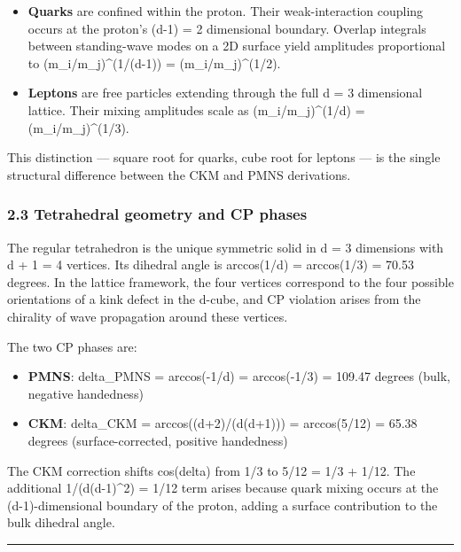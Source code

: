 \documentclass[
]{article}
\providecommand{\tightlist}{%
  \setlength{\itemsep}{0pt}\setlength{\parskip}{0pt}}
\begin{document}
\begin{itemize}
\item
  \textbf{Quarks} are confined within the proton. Their weak-interaction
  coupling occurs at the proton's (d-1) = 2 dimensional boundary.
  Overlap integrals between standing-wave modes on a 2D surface yield
  amplitudes proportional to (m\_i/m\_j)\^{}(1/(d-1)) =
  (m\_i/m\_j)\^{}(1/2).
\item
  \textbf{Leptons} are free particles extending through the full d = 3
  dimensional lattice. Their mixing amplitudes scale as
  (m\_i/m\_j)\^{}(1/d) = (m\_i/m\_j)\^{}(1/3).
\end{itemize}

This distinction --- square root for quarks, cube root for leptons ---
is the single structural difference between the CKM and PMNS
derivations.

\subsubsection{2.3 Tetrahedral geometry and CP
phases}\label{tetrahedral-geometry-and-cp-phases}

The regular tetrahedron is the unique symmetric solid in d = 3
dimensions with d + 1 = 4 vertices. Its dihedral angle is arccos(1/d) =
arccos(1/3) = 70.53 degrees. In the lattice framework, the four vertices
correspond to the four possible orientations of a kink defect in the
d-cube, and CP violation arises from the chirality of wave propagation
around these vertices.

The two CP phases are:

\begin{itemize}
\tightlist
\item
  \textbf{PMNS}: delta\_PMNS = arccos(-1/d) = arccos(-1/3) = 109.47
  degrees (bulk, negative handedness)
\item
  \textbf{CKM}: delta\_CKM = arccos((d+2)/(d(d+1))) = arccos(5/12) =
  65.38 degrees (surface-corrected, positive handedness)
\end{itemize}

The CKM correction shifts cos(delta) from 1/3 to 5/12 = 1/3 + 1/12. The
additional 1/(d(d-1)\^{}2) = 1/12 term arises because quark mixing
occurs at the (d-1)-dimensional boundary of the proton, adding a surface
contribution to the bulk dihedral angle.

\begin{center}\rule{0.5\linewidth}{0.5pt}\end{center}
\end{document}
